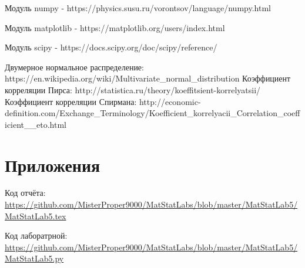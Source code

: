 \documentclass[a4]{article}
\begin{document}
\begin{thebibliography}{}
      Модуль numpy  -  https://physics.susu.ru/vorontsov/language/numpy.html
    
    Модуль matplotlib - https://matplotlib.org/users/index.html
    
    Модуль scipy - https://docs.scipy.org/doc/scipy/reference/
    
Двумерное нормальное распределение: https://en.wikipedia.org/wiki/Multivariate\_normal\_distribution
Коэффициент корреляции Пирса: http://statistica.ru/theory/koeffitsient-korrelyatsii/ 
Коэффициент корреляции Спирмана: 
http://economic-definition.com/Exchange\_Terminology/Koefficient\_korrelyacii\_Correlation\_coefficient\_\_eto.html


\end{thebibliography}

\section{Приложения}


Код отчёта:\; \url{https://github.com/MisterProper9000/MatStatLabs/blob/master/MatStatLab5/MatStatLab5.tex}

Код лаборатрной:\; \url{https://github.com/MisterProper9000/MatStatLabs/blob/master/MatStatLab5/MatStatLab5.py}
\end{document}
